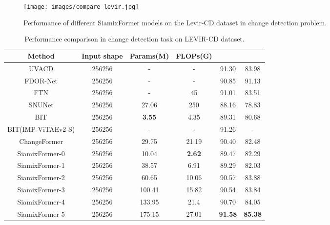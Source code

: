 \documentclass{article}
\begin{document}
\begin{figure*}[b!]
	\begin{center}
		\texttt{[image: images/compare\_levir.jpg]}
		\caption{Performance of different SiamixFormer models on the Levir-CD dataset in change detection problem.}
		\label{compare_levir}
	\end{center}
\end{figure*}


\begin{table}[b]
	\begin{center}
		\caption{Performance comparison in change detection task on LEVIR-CD dataset.}
		\label{table3}
		\begin{tabular}{c|ccccc}
			\hline
			\hline
			
			Method & Input shape & Params(M) & FLOPs(G) &  &  \\
			\hline
			UVACD  & 256256& -& -& 91.30 & 83.98 \\
			FDOR-Net  & 256256& -& -& 90.85 & 91.13 \\
			FTN  & 256256& - & 45& 91.01 & 83.51 \\
			SNUNet & 256256 & 27.06 & 250 &88.16 &78.83 \\
			BIT  & 256256 & \textbf{3.55}&4.35 &89.31 &80.68  \\
			BIT(IMP-ViTAEv2-S) & 256256& -& -& 91.26&-\\
			ChangeFormer  & 256256& 29.75 & 21.19& 90.40 &82.48 \\
			\hline
			SiamixFormer-0 &256256 & 10.04 &  \textbf{2.62}  &89.47&82.29  \\
			SiamixFormer-1 &256256 & 38.57&6.91 &   89.29&82.03  \\
			SiamixFormer-2 &256256 & 60.65& 10.06&   90.57&83.88 \\
			SiamixFormer-3 &256256 & 100.41& 15.82&   90.54&83.84 \\
			SiamixFormer-4 &256256 & 133.95&21.4 &   90.70 & 84.05   \\
			SiamixFormer-5 &256256 & 175.15& 27.01&    \textbf{91.58} & \textbf{85.38}\\
			\hline
			\hline			
		\end{tabular}  
	\end{center}
\end{table}
\end{document}
